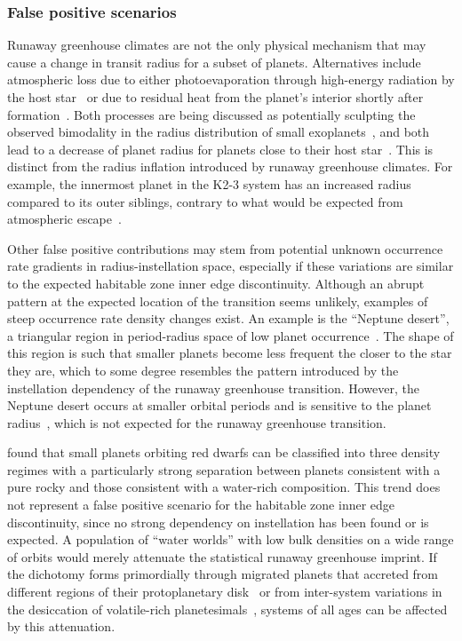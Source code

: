 \documentclass[twocolumn,twocolappendix]{aastex631}
\begin{document}
\subsubsection{False positive scenarios}\label{sec:dis_falsepositive}
Runaway greenhouse climates are not the only physical mechanism that may cause a change in transit radius for a subset of planets.
Alternatives include atmospheric loss due to either photoevaporation through high-energy radiation by the host star~\citep[e.g.,][]{2012ApJ...753...66I,Owen2013,Jin2014,Mordasini2020a} or due to residual heat from the planet's interior shortly after formation~\citep{Ginzburg2016b,Ginzburg2018,Gupta2019}.
Both processes are being discussed as potentially sculpting the observed bimodality in the radius distribution of small exoplanets~\citep{Fulton2017,VanEylen2018}, and both lead to a decrease of planet radius for planets close to their host star~\citep{Pascucci2019,Bergsten2022}.
This is distinct from the radius inflation introduced by runaway greenhouse climates.
For example, the innermost planet in the \mbox{K2-3} system has an increased radius compared to its outer siblings, contrary to what would be expected from atmospheric escape~\citep{2022AJ....164..172D}.

Other false positive contributions may stem from potential unknown occurrence rate gradients in radius-instellation space, especially if these variations are similar to the expected habitable zone inner edge discontinuity.
Although an abrupt pattern at the expected location of the transition seems unlikely, examples of steep occurrence rate density changes exist.
An example is the ``Neptune desert'', a triangular region in period-radius space of low planet occurrence~\citep{Szabo2011,Mazeh2016,Dreizler2020b}.
The shape of this region is such that smaller planets become less frequent the closer to the star they are, which to some degree resembles the pattern introduced by the instellation dependency of the runaway greenhouse transition.
However, the Neptune desert occurs at smaller orbital periods and is sensitive to the planet radius~\citep{Szabo2011}, which is not expected for the runaway greenhouse transition.

\citet{Luque2022} found that small planets orbiting red dwarfs can be classified into three density regimes with a particularly strong separation between planets consistent with a pure rocky and those consistent with a water-rich composition.
This trend does not represent a false positive scenario for the habitable zone inner edge discontinuity, since no strong dependency on instellation has been found or is expected.
A population of ``water worlds'' with low bulk densities on a wide range of orbits would merely attenuate the statistical runaway greenhouse imprint.
If the dichotomy forms primordially through migrated planets that accreted from different regions of their protoplanetary disk~\citep{Venturini2020,Burn2021,Schlecker2021,Schlecker2021b} or from inter-system variations in the desiccation of volatile-rich planetesimals~\citep{Lichtenberg2019,2021Sci...371..365L,2021ApJ...913L..20L,2022ApJ...938L...3L,2023NatAs...7...39B}, systems of all ages can be affected by this attenuation.
\end{document}
